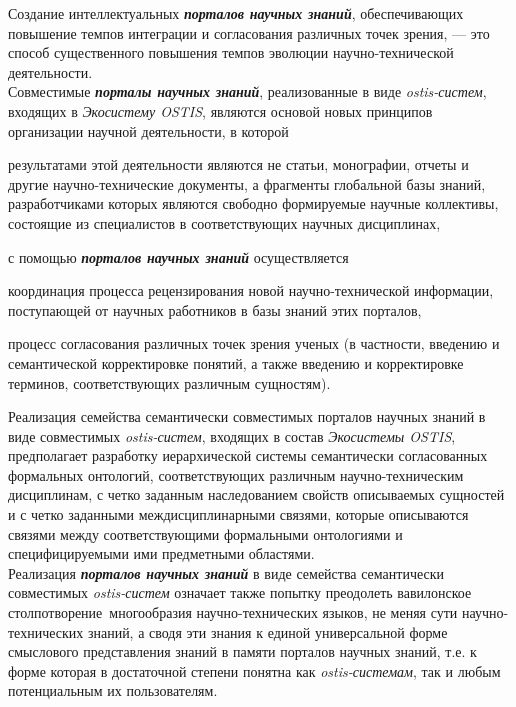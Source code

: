 \begin{SCn}
\begin{scnsubstruct}
{\begin{scnitemize}
        \end{scnitemize}
        Создание интеллектуальных \textbf{\textit{порталов научных знаний}}, обеспечивающих повышение темпов интеграции и согласования различных точек зрения, --- это способ существенного повышения темпов эволюции научно-технической деятельности.\\
        Совместимые \textbf{\textit{порталы научных знаний}}, реализованные в виде \textit{ostis-систем}, входящих в \textit{Экосистему OSTIS}, являются основой новых принципов организации научной деятельности, в которой
        \begin{scnitemize}
            \item результатами этой деятельности являются не статьи, монографии, отчеты и другие научно-технические документы, а фрагменты глобальной базы знаний, разработчиками которых являются свободно формируемые научные коллективы, состоящие из специалистов в соответствующих научных дисциплинах,
            \item с помощью \textbf{\textit{порталов научных знаний}} осуществляется
            \begin{scnitemizeii}
                \item координация процесса рецензирования новой научно-технической информации, поступающей от научных работников в базы знаний этих порталов,
                \item процесс согласования различных точек зрения ученых (в частности, введению и семантической корректировке понятий, а также введению и корректировке терминов, соответствующих различным сущностям).
            \end{scnitemizeii}
        \end{scnitemize}
        Реализация семейства семантически совместимых порталов научных знаний в виде совместимых \textit{\mbox{ostis-систем}}, входящих в состав \textit{Экосистемы OSTIS}, предполагает разработку иерархической системы семантически согласованных формальных онтологий, соответствующих различным научно-техническим дисциплинам, с четко заданным наследованием свойств описываемых сущностей и с четко заданными междисциплинарными связями, которые описываются связями между соответствующими формальными онтологиями и специфицируемыми ими предметными областями.\\
        Реализация \textbf{\textit{порталов научных знаний}} в виде семейства семантически совместимых \textit{ostis-систем} означает также попытку преодолеть вавилонское столпотворение\ многообразия научно-технических языков, не меняя сути научно-технических знаний, а сводя эти знания к единой универсальной форме смыслового представления знаний в памяти порталов научных знаний, т.е. к форме которая в достаточной степени понятна как \textit{ostis-системам}, так и любым потенциальным их пользователям.\\
}
\end{scnsubstruct}
\end{SCn}
